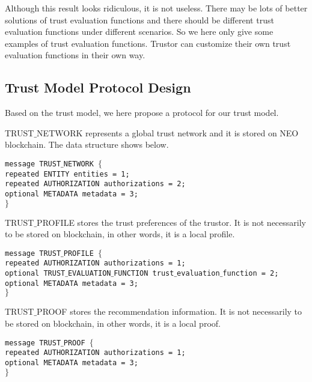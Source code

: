 \documentclass{article}
\begin{document}
Although this result looks ridiculous, it is not useless. There may be lots of better solutions of trust evaluation functions and there should be
different trust evaluation functions under different scenarios. So we here only give some examples of trust evaluation functions. Trustor can customize
their own trust evaluation functions in their own way.


\subsection{Trust Model Protocol Design}

Based on the trust model, we here propose a protocol for our trust model.

TRUST$\_$NETWORK represents a global trust network and it is stored on NEO blockchain. The data structure shows below.


\noindent \texttt{message TRUST$\_$NETWORK $\{$\\
\hspace*{2.ex} repeated ENTITY entities = 1;\\
\hspace*{2.ex} repeated AUTHORIZATION authorizations = 2;\\
\hspace*{2.ex} optional METADATA metadata = 3;\\
$\}$}

TRUST$\_$PROFILE stores the trust preferences of the trustor. It is not necessarily to be stored on blockchain, in other words, it is a local profile.


\noindent \texttt{message TRUST$\_$PROFILE $\{$\\
\hspace*{2.ex} repeated AUTHORIZATION authorizations = 1;\\
\hspace*{2.ex} optional TRUST$\_$EVALUATION$\_$FUNCTION trust$\_$evaluation$\_$function = 2;\\
\hspace*{2.ex} optional METADATA metadata = 3;\\
$\}$}

TRUST$\_$PROOF stores the recommendation information. It is not necessarily to be stored on blockchain, in other words, it is a local proof.


\noindent \texttt{message TRUST$\_$PROOF $\{$\\
\hspace*{2.ex} repeated AUTHORIZATION authorizations = 1;\\
\hspace*{2.ex} optional METADATA metadata = 3;\\
$\}$}
\end{document}
